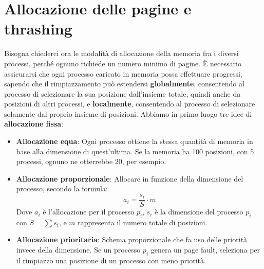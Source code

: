 \section{Allocazione delle pagine e thrashing}
Bisogna chiederci ora le modalità di allocazione della memoria fra i diversi processi, perché ognuno richiede un numero minimo di pagine. È necessario
assicurarsi che ogni processo caricato in memoria possa effettuare progressi, sapendo che il rimpiazzamento può estendersi \textbf{globalmente},
consentendo al processo di selezionare la sua posizione dall'insieme totale, quindi anche da posizioni di altri processi, e \textbf{localmente},
consentendo al processo di selezionare solamente dal proprio insieme di posizioni. Abbiamo in primo luogo tre idee di \textbf{allocazione fissa}:
\begin{itemize}
    \item \textbf{Allocazione equa}: Ogni processo ottiene la stessa quantità di memoria in base alla dimensione di quest'ultima. Se la memoria ha 100
    posizioni, con 5 processi, ognuno ne otterrebbe 20, per esempio.
    \item \textbf{Allocazione proporzionale}: Allocare in funzione della dimensione del processo, secondo la formula: \[
        a_i = \frac{s_i}{S}\cdot m
    \]
    \noindent Dove $a_i$ è l'allocazione per il processo $p_i$, $s_i$ è la dimensione del processo $p_i$ con $S = \sum s_i$, e $m$ rappresenta il numero
    totale di posizioni.
    \item \textbf{Allocazione prioritaria}: Schema proporzionale che fa uso delle priorità invece della dimensione. Se un processo $p_i$ genera un page
    fault, seleziona per il rimpiazzo una posizione di un processo con meno priorità.
\end{itemize}

